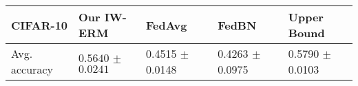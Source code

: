 \begin{tabular}{lllll}
\toprule
{CIFAR-10} &              \textbf{Our IW-ERM} &   FedAvg & FedBN & Upper Bound \\
\midrule
{Avg. accuracy}  & $\boldsymbol{0.5640}$ $\pm$ $\boldsymbol{0.0241}$ &0.4515 $\pm$ 0.0148 & 0.4263 $\pm$ 0.0975 &   0.5790 $\pm$ 0.0103 \\
\bottomrule
\end{tabular}
